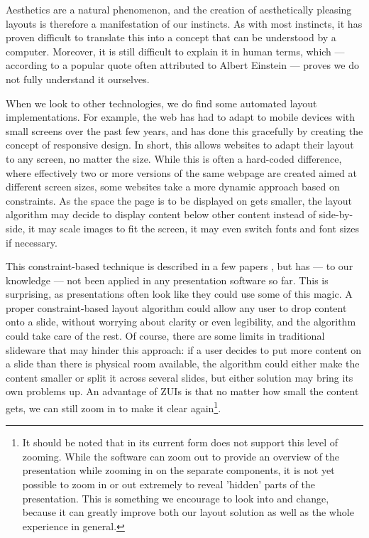    Aesthetics are a natural phenomenon, and the creation of aesthetically
   pleasing layouts is therefore a manifestation of our instincts. As with most
   instincts, it has proven difficult to translate this into a concept that can
   be understood by a computer. Moreover, it is still difficult to explain it
   in human terms, which --- according to a popular quote often attributed to
   Albert Einstein --- proves we do not fully understand it ourselves.

   When we look to other technologies, we do find some automated layout
   implementations. For example, the web has had to adapt to mobile devices
   with small screens over the past few years, and has done this gracefully by
   creating the concept of responsive design. In short, this allows websites to
   adapt their layout to any screen, no matter the size. While this is often a
   hard-coded difference, where effectively two or more versions of the same
   webpage are created aimed at different screen sizes, some websites take a
   more dynamic approach based on constraints. As the space the page is to be
   displayed on gets smaller, the layout algorithm may decide to display
   content below other content instead of side-by-side, it may scale images to
   fit the screen, it may even switch fonts and font sizes if necessary.

   This constraint-based technique is described in a few papers
   \citep{lok-1,hurst-1}, but has --- to our knowledge --- not been applied in
   any presentation software so far. This is surprising, as presentations often
   look like they could use some of this magic. A proper constraint-based
   layout algorithm could allow any user to drop content onto a slide, without
   worrying about clarity or even legibility, and the algorithm could take care
   of the rest. Of course, there are some limits in traditional slideware that
   may hinder this approach: if a user decides to put more content on a slide
   than there is physical room available, the algorithm could either make the
   content smaller or split it across several slides, but either solution may
   bring its own problems up. An advantage of ZUIs is that no matter how small
   the content gets, we can still zoom in to make it clear again\footnote{It
   should be noted that \mxp in its current form does not support this level of
   zooming. While the software can zoom out to provide an overview of the
   presentation while zooming in on the separate components, it is not yet
   possible to zoom in or out extremely to reveal 'hidden' parts of the
   presentation. This is something we encourage to look into and change,
   because it can greatly improve both our layout solution as well as the whole
   \mxp experience in general.}.

